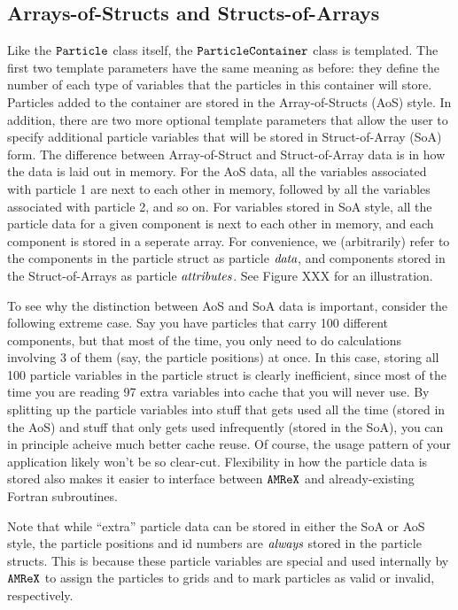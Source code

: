 \subsection{Arrays-of-Structs and Structs-of-Arrays}

Like the $\tt{Particle}$ class itself, the $\tt{ParticleContainer}$ class is templated. The first two template parameters have the same meaning as before: they define the number of each type of variables that the particles in this container will store. Particles added to the container are stored in the Array-of-Structs (AoS) style. In addition, there are two more optional template parameters that allow the user to specify additional particle variables that will be stored in Struct-of-Array (SoA) form. The difference between Array-of-Struct and Struct-of-Array data is in how the data is laid out in memory. For the AoS data, all the variables associated with particle 1 are next to each other in memory, followed by all the variables associated with particle 2, and so on. For variables stored in SoA style, all the particle data for a given component is next to each other in memory, and each component is stored in a seperate
array. For convenience, we (arbitrarily) refer to the components in the particle struct as particle $\emph{data}$, and components stored in the Struct-of-Arrays as particle
$\emph{attributes}$. See Figure XXX for an illustration.

To see why the distinction between AoS and SoA data is important, consider the following extreme case. Say you have particles that carry 100 different components,
but that most of the time, you only need to do calculations involving 3 of them (say, the particle positions) at once. In this case, storing all 100 particle variables in the particle
struct is clearly inefficient, since most of the time you are reading 97 extra variables into cache that you will never use. By splitting up the particle variables into stuff that gets 
used all the time (stored in the AoS) and stuff that only gets used infrequently (stored in the SoA), you can in principle acheive much better cache reuse. Of course, the usage pattern of your application likely won't be so clear-cut. Flexibility in how the particle data is stored also makes it easier to interface between $\tt{AMReX}$ and already-existing Fortran subroutines.

Note that while ``extra'' particle data can be stored in either the SoA or AoS style, the particle positions and id numbers are $\emph{always}$ stored in the particle
structs. This is because these particle variables are special and used internally by $\tt{AMReX}$ to assign the particles to grids and to mark particles as valid or invalid, respectively.

